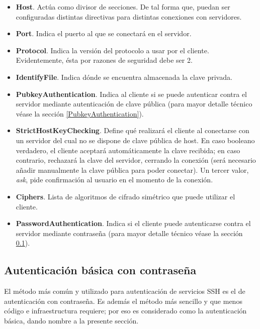 \documentclass[a4paper, 11pt, titlepage]{article}
\begin{document}
        \begin{itemize}
            \item \textbf{Host}. Actúa como divisor de secciones. De tal forma que, puedan ser configuradas distintas directivas 
            para distintas conexiones con servidores.
            \item \textbf{Port}. Indica el puerto al que se conectará en el servidor.
            \item \textbf{Protocol}. Indica la versión del protocolo a usar por el cliente. Evidentemente, ésta por razones de 
            seguridad debe ser 2.
            \item \textbf{IdentifyFile}. Indica dónde se encuentra almacenada la clave privada.
            \item \textbf{PubkeyAuthentication}. Indica al cliente si se puede autenticar contra el servidor mediante 
            autenticación de clave pública (para mayor detalle técnico véase la sección \ref{PubkeyAuthentication}). 
            \item \textbf{StrictHostKeyChecking}. Define qué realizará el cliente al conectarse con un servidor del cual no 
            se dispone de clave pública de host. En caso booleano verdadero, el cliente aceptará automáticamente la clave recibida; 
            en caso contrario, rechazará la clave del servidor, cerrando la conexión (será necesario añadir manualmente la clave 
            pública para poder conectar). Un tercer valor, \textit{ask}, pide confirmación al usuario en el momento de la 
            conexión.
            \item \textbf{Ciphers}. Lista de algoritmos de cifrado simétrico que puede utilizar el cliente.
            \item \textbf{PasswordAuthentication}. Indica si el cliente puede autenticarse contra el servidor mediante contraseña 
            (para mayor detalle técnico véase la sección \ref{PasswordAuthentication}).
        \end{itemize}

    \subsection{Autenticación básica con contraseña}\label{PasswordAuthentication}

        El método más común y utilizado para autenticación de servicios SSH es el de autenticación con contraseña. Es además 
        el método más sencillo y que menos código e infraestructura requiere; por eso es considerado como la autenticación 
        básica, dando nombre a la presente sección.
\end{document}
